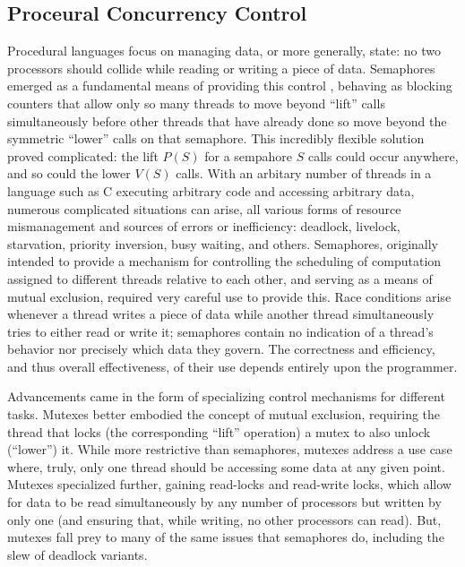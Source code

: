 \subsection{Proceural Concurrency Control}
Procedural languages focus on managing data, or more generally, state: no two
processors should collide while reading or writing a piece of data. Semaphores
emerged as a fundamental means of providing this control \cite{semaphore},
behaving as blocking counters that allow only so many threads to move beyond
``lift'' calls simultaneously before other threads that have already done so
move beyond the symmetric ``lower'' calls on that semaphore. This incredibly
flexible solution proved complicated: the lift $P(S)$ for a sempahore $S$ calls
could occur anywhere, and so could the lower $V(S)$ calls. With an arbitary
number of threads in a language such as C executing arbitrary code and accessing
arbitrary data, numerous complicated situations can arise, all various
forms of resource mismanagement and sources of errors or inefficiency: deadlock,
livelock, starvation, priority inversion, busy waiting, and others. Semaphores,
originally intended to provide a mechanism for controlling the scheduling of
computation assigned to different threads relative to each other, and serving as
a means of mutual exclusion, required very careful use to provide this.
Race conditions arise whenever a thread writes a piece of data while another
thread simultaneously tries to either read or write it; semaphores contain no
indication of a thread's behavior nor precisely which data they govern. The
correctness and efficiency, and thus overall effectiveness, of their use depends
entirely upon the programmer.

Advancements came in the form of specializing control mechanisms for different
tasks. Mutexes better embodied the concept of mutual exclusion, requiring the
thread that locks (the corresponding ``lift'' operation) a mutex to also unlock
(``lower'') it. While more restrictive than semaphores, mutexes address a use
case where, truly, only one thread should be accessing some data at any given
point. Mutexes specialized further, gaining read-locks and read-write locks,
which allow for data to be read simultaneously by any number of processors but
written by only one (and ensuring that, while writing, no other processors can
read). But, mutexes fall prey to many of the same issues that semaphores do,
including the slew of deadlock variants.

